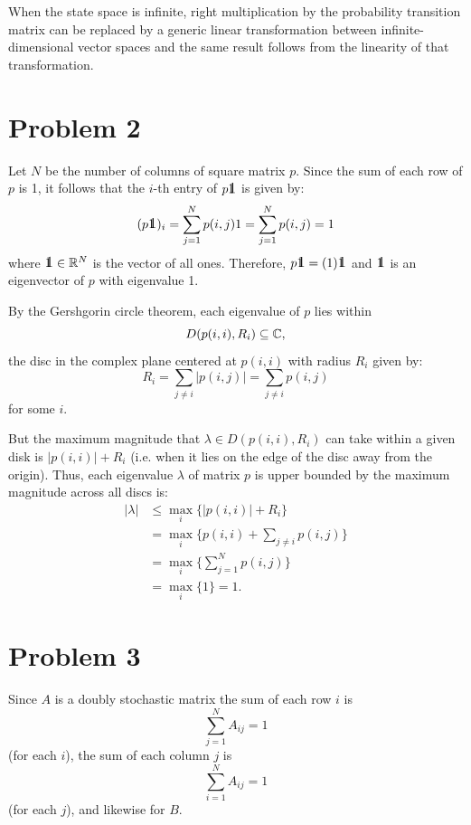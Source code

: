 \documentclass{homework}
\begin{document}
When the state space is infinite, right multiplication by the probability transition
matrix can be replaced by a generic linear transformation between
infinite-dimensional vector spaces and the same result follows from the linearity
of that transformation.


\section{Problem 2}
\begin{letterenum}
\item Let $N$ be the number of columns of square matrix $p$.
Since the sum of each row of $p$ is 1, it follows that
the $i$-th entry of $p \one$ is given by:
\begin{align*}
    (p \one)_i = \sum_{j=1}^N p(i,j) 1 = \sum_{j=1}^N p(i,j) = 1
\end{align*}
where $\one\in\R^N$ is the vector of all ones. Therefore, $p \one = (1) \one$
and $\one$ is an eigenvector of $p$ with eigenvalue 1.

\item By the Gershgorin circle theorem, each eigenvalue of $p$ lies within
\begin{equation*}
    D(p(i, i), R_i) \subseteq \mathbb{C},
\end{equation*}
the disc in the complex plane centered at $p(i, i)$ with radius $R_i$ given
by:
\begin{equation*}
    R_i = \sum_{j\neq i} |p(i, j)| = \sum_{j \neq i} p(i, j)
\end{equation*}
for some $i$.

But the maximum magnitude that $\lambda \in D(p(i, i), R_i)$ can take
within a given disk is $|p(i, i)| + R_i$ (i.e. when it lies on the edge of the disc
away from the origin). Thus, each eigenvalue $\lambda$ of matrix $p$
is upper bounded by the maximum magnitude across all discs is:
\begin{align*}
    |\lambda| &\leq \max_i \{|p(i, i)| + R_i\} \\
        &= \max_i \{p(i, i) + \sum_{j\neq i} p(i, j)\} \\
        &= \max_i \{\sum_{j=1}^{N} p(i, j)\} \\
        &= \max_i \{1 \} = 1.
\end{align*}

\section{Problem 3}
Since $A$ is a doubly stochastic matrix the sum of each row $i$ is
\begin{equation*}
    \sum_{j=1}^N A_{ij} = 1
\end{equation*}
(for each $i$), the sum of each column $j$ is
\begin{equation*}
    \sum_{i=1}^N A_{ij} = 1
\end{equation*}
(for each $j$), and likewise for $B$.


\end{letterenum}
\end{document}
